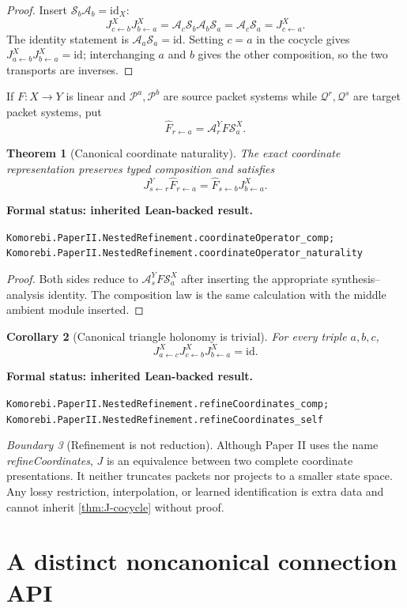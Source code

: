 \documentclass[11pt]{article}
\newtheorem{theorem}{Theorem}[section]
\newtheorem{corollary}[theorem]{Corollary}
\theoremstyle{definition}
\theoremstyle{remark}
\newtheorem{boundary}[theorem]{Boundary}
\newcommand{\cA}{\mathcal A}
\newcommand{\cP}{\mathcal P}
\newcommand{\cQ}{\mathcal Q}
\newcommand{\cS}{\mathcal S}
\newcommand{\id}{\mathrm{id}}
\newcommand{\leanname}[1]{\nolinkurl{#1}}
\newcommand{\statusleanprior}[1]{%
  \par\smallskip\noindent
  {\color{leanblue}\textbf{Formal status: inherited Lean-backed result.}}\par
  \begingroup\small\raggedright\leanname{#1}\par\endgroup\smallskip}
\begin{document}
\begin{proof}
Insert $\cS_b\cA_b=\id_X$:
\[
J^X_{c\leftarrow b}J^X_{b\leftarrow a}
=\cA_c\cS_b\cA_b\cS_a
=\cA_c\cS_a
=J^X_{c\leftarrow a}.
\]
The identity statement is $\cA_a\cS_a=\id$.  Setting $c=a$ in the cocycle
gives $J^X_{a\leftarrow b}J^X_{b\leftarrow a}=\id$; interchanging $a$ and $b$
gives the other composition, so the two transports are inverses.
\end{proof}

If $F:X\to Y$ is linear and $\cP^a,\cP^b$ are source packet systems while
$\cQ^r,\cQ^s$ are target packet systems, put
\[
\widehat F_{r\leftarrow a}
=
\cA^Y_rF\cS^X_a.
\]

\begin{theorem}[Canonical coordinate naturality]
\label{thm:canonical-naturality}
The exact coordinate representation preserves typed composition and satisfies
\[
J^Y_{s\leftarrow r}\widehat F_{r\leftarrow a}
=
\widehat F_{s\leftarrow b}J^X_{b\leftarrow a}.
\]
\end{theorem}
\statusleanprior{Komorebi.PaperII.NestedRefinement.coordinateOperator_comp; Komorebi.PaperII.NestedRefinement.coordinateOperator_naturality}

\begin{proof}
Both sides reduce to $\cA^Y_sF\cS^X_a$ after inserting the appropriate
synthesis--analysis identity.  The composition law is the same calculation
with the middle ambient module inserted.
\end{proof}

\begin{corollary}[Canonical triangle holonomy is trivial]
\label{cor:J-flat}
For every triple $a,b,c$,
\[
J^X_{a\leftarrow c}J^X_{c\leftarrow b}J^X_{b\leftarrow a}=\id.
\]
\end{corollary}
\statusleanprior{Komorebi.PaperII.NestedRefinement.refineCoordinates_comp; Komorebi.PaperII.NestedRefinement.refineCoordinates_self}

\begin{boundary}[Refinement is not reduction]
Although Paper II uses the name \emph{refineCoordinates}, $J$ is an
equivalence between two complete coordinate presentations.  It neither
truncates packets nor projects to a smaller state space.  Any lossy
restriction, interpolation, or learned identification is extra data and
cannot inherit \cref{thm:J-cocycle} without proof.
\end{boundary}

\section{A distinct noncanonical connection API}
\label{sec:connection}
\end{document}
